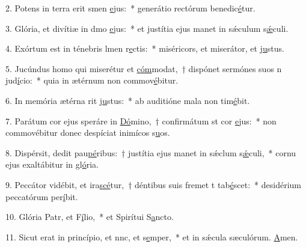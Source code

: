 2. Potens in terra erit smen \uline{e}jus:~* generátio rectórum benedic\uline{é}tur.\par 
3. Glória, et divítiæ in dmo \uline{e}jus:~* et justítia ejus manet in sǽculum s\uline{ǽ}culi.\par 
4. Exórtum est in ténebris lmen r\uline{e}ctis:~* miséricors, et miserátor, et j\uline{u}stus.\par 
5. Jucúndus homo qui miserétur et \uline{cóm}modat,~† dispónet sermónes suos n jud\uline{í}cio:~* quia in ætérnum non commov\uline{é}bitur.\par 
6. In memória ætérna rit j\uline{u}stus:~* ab auditióne mala non tim\uline{é}bit.\par 
7. Parátum cor ejus speráre in \uline{Dó}mino,~† confirmátum st cor \uline{e}jus:~* non commovébitur donec despíciat inimícos s\uline{u}os.\par 
8. Dispérsit, dedit pau\uline{pé}ribus:~† justítia ejus manet in sǽclum s\uline{ǽ}culi,~* cornu ejus exaltábitur in gl\uline{ó}ria.\par 
9. Peccátor vidébit, et ira\uline{scé}tur,~† déntibus suis fremet t tab\uline{é}scet:~* desidérium peccatórum per\uline{í}bit.\par 
10. Glória Patr, et F\uline{í}lio,~* et Spirítui S\uline{a}ncto.\par 
11. Sicut erat in princípio, et nnc, et s\uline{e}mper,~* et in sǽcula sæculórum. \uline{A}men.\par 
